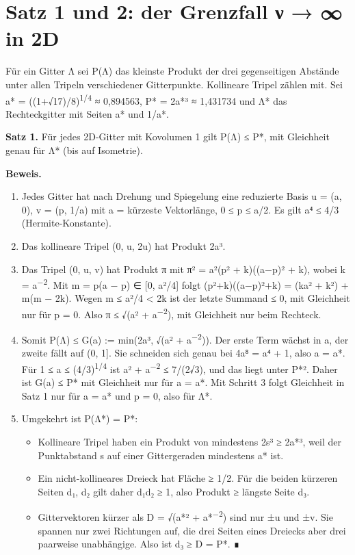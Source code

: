 \section{Satz 1 und 2: der Grenzfall ν → ∞ in 2D}

Für ein Gitter Λ sei P(Λ) das kleinste Produkt der drei gegenseitigen Abstände unter allen Tripeln verschiedener Gitterpunkte. Kollineare Tripel zählen mit. Sei a* = ((1+√17)/8)\textsuperscript{1/4} ≈ 0,894563, P* = 2a*³ ≈ 1,431734 und Λ* das Rechteckgitter mit Seiten a* und 1/a*.

\textbf{Satz 1.} Für jedes 2D-Gitter mit Kovolumen 1 gilt P(Λ) ≤ P*, mit Gleichheit genau für Λ* (bis auf Isometrie).

\textbf{Beweis.}

\begin{enumerate}
\def\labelenumi{\arabic{enumi}.}
\tightlist
\item
  Jedes Gitter hat nach Drehung und Spiegelung eine reduzierte Basis u = (a, 0), v = (p, 1/a) mit a = kürzeste Vektorlänge, 0 ≤ p ≤ a/2. Es gilt a⁴ ≤ 4/3 (Hermite-Konstante).
\item
  Das kollineare Tripel (0, u, 2u) hat Produkt 2a³.
\item
  Das Tripel (0, u, v) hat Produkt π mit π² = a²(p² + k)((a−p)² + k), wobei k = a\textsuperscript{−2}. Mit m = p(a − p) ∈ {[}0, a²/4{]} folgt (p²+k)((a−p)²+k) = (ka² + k²) + m(m − 2k). Wegen m ≤ a²/4 \textless{} 2k ist der letzte Summand ≤ 0, mit Gleichheit nur für p = 0. Also π ≤ √(a² + a\textsuperscript{−2}), mit Gleichheit nur beim Rechteck.
\item
  Somit P(Λ) ≤ G(a) := min(2a³, √(a² + a\textsuperscript{−2})). Der erste Term wächst in a, der zweite fällt auf (0, 1{]}. Sie schneiden sich genau bei 4a⁸ = a⁴ + 1, also a = a*. Für 1 ≤ a ≤ (4/3)\textsuperscript{1/4} ist a² + a\textsuperscript{−2} ≤ 7/(2√3), und das liegt unter P*². Daher ist G(a) ≤ P* mit Gleichheit nur für a = a*. Mit Schritt 3 folgt Gleichheit in Satz 1 nur für a = a* und p = 0, also für Λ*.
\item
  Umgekehrt ist P(Λ*) = P*:

  \begin{itemize}
  \tightlist
  \item
    Kollineare Tripel haben ein Produkt von mindestens 2s³ ≥ 2a*³, weil der Punktabstand s auf einer Gittergeraden mindestens a* ist.
  \item
    Ein nicht-kollineares Dreieck hat Fläche ≥ 1/2. Für die beiden kürzeren Seiten d₁, d₂ gilt daher d₁d₂ ≥ 1, also Produkt ≥ längste Seite d₃.
  \item
    Gittervektoren kürzer als D = √(a*² + a*\textsuperscript{−2}) sind nur ±u und ±v. Sie spannen nur zwei Richtungen auf, die drei Seiten eines Dreiecks aber drei paarweise unabhängige. Also ist d₃ ≥ D = P*. ∎
  \end{itemize}
\end{enumerate}

